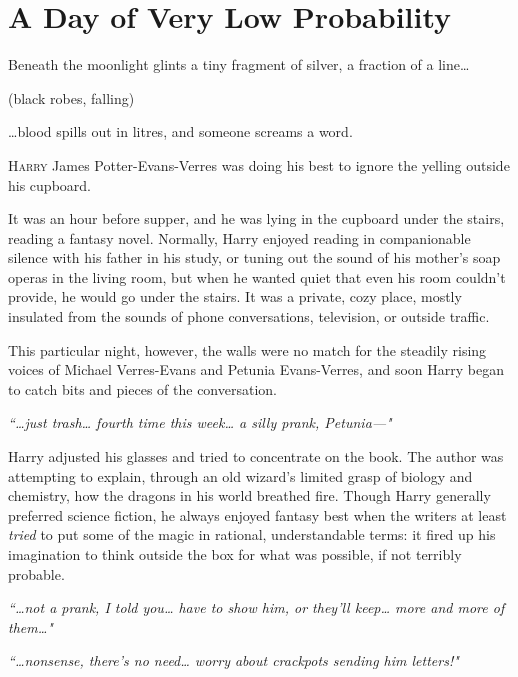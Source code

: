 \chapter{A Day of Very Low Probability}

\begin{chapterOpeningQuote}
\noindent
Beneath the moonlight glints a tiny fragment of silver, a fraction of a line{\ldots}

\vspace*{2ex}
(black robes, falling)

\vspace*{2ex}
{\ldots}blood spills out in litres, and someone screams a word.
\end{chapterOpeningQuote}

\lettrine{H}{arry} James Potter-Evans-Verres was doing his best to ignore the yelling outside his cupboard.

It was an hour before supper, and he was lying in the cupboard under the stairs, reading a fantasy novel. Normally, Harry enjoyed reading in companionable silence with his father in his study, or tuning out the sound of his mother's soap operas in the living room, but when he wanted quiet that even his room couldn't provide, he would go under the stairs. It was a private, cozy place, mostly insulated from the sounds of phone conversations, television, or outside traffic.

This particular night, however, the walls were no match for the steadily rising voices of Michael Verres-Evans and Petunia Evans-Verres, and soon Harry began to catch bits and pieces of the conversation.

\emph{``{\ldots}just trash{\ldots} fourth time this week{\ldots} a silly prank, Petunia---"}

Harry adjusted his glasses and tried to concentrate on the book. The author was attempting to explain, through an old wizard's limited grasp of biology and chemistry, how the dragons in his world breathed fire. Though Harry generally preferred science fiction, he always enjoyed fantasy best when the writers at least \emph{tried} to put some of the magic in rational, understandable terms: it fired up his imagination to think outside the box for what was possible, if not terribly probable.

\emph{``{\ldots}not a prank, I told you{\ldots} have to show him, or they'll keep{\ldots} more and more of them{\ldots}"}

\emph{``{\ldots}nonsense, there's no need{\ldots} worry about crackpots sending him letters!"}

